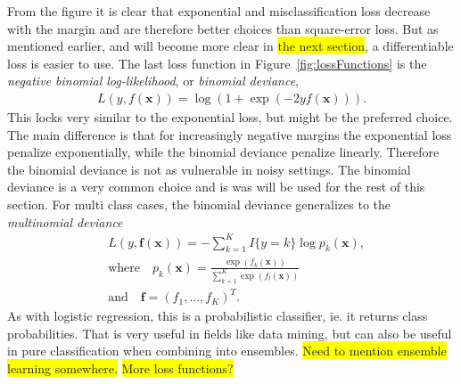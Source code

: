 From the figure it is clear that exponential and misclassification loss decrease with the margin and are therefore better choices than square-error loss. But as mentioned earlier, and will become more clear in \colorbox{yellow}{the next section}, a differentiable loss is easier to use. The last loss function in Figure~\ref{fig:lossFunctions} is the \textit{negative binomial log-likelihood}, or \textit{binomial deviance},
\begin{align}
  L(y, f(\mathbf{x})) = \log \left( 1 + \exp (-2 y f(\mathbf{x})) \right).
\end{align}
This locks very similar to the exponential loss, but might be the preferred choice. The main difference is that for increasingly negative margins the exponential loss penalize exponentially, while the binomial deviance penalize linearly. Therefore the binomial deviance is not as vulnerable in noisy settings. The binomial deviance is a very common choice and is was will be used for the rest of this section. For multi class cases, the binomial deviance generalizes to the \textit{multinomial deviance}
\begin{align}
  \label{eq:multinomialDeviance} 
  &L(y, \mathbf{f}( \mathbf{x })) = - \sum^{K}_{k=1} I\{y = k\} \log p_k(\mathbf{x}), \\
  \label{eq:multinomialDevianceProb} 
  &\text{where} \quad p_k(\mathbf{x}) = \frac{\exp (f_k(\mathbf{x}))}{\sum^{K}_{k=1} \exp (f_l(\mathbf{x}))}\\
  &\text{and} \quad \mathbf{f} = (f_1, \ldots, f_K)^T.
\end{align}
As with logistic regression, this is a probabilistic classifier, ie. it returns class probabilities. That is very useful in fields like data mining, but can also be useful in pure classification when combining into ensembles. \colorbox{yellow}{Need to mention ensemble learning somewhere.}
\colorbox{yellow}{More loss functions?}
%
